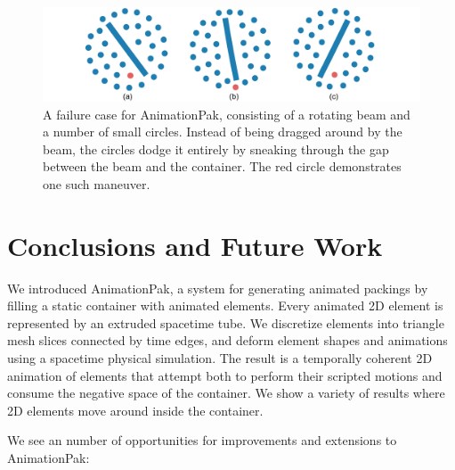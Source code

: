 \begin{figure}[t]
\centering
\includegraphics[width=1.0\textwidth]{figures/animationpak/blender.pdf} 
\caption[A failure case for AnimationPak]
{\label{fig_animationpak_blender} 
A failure case for AnimationPak, consisting of 
a rotating beam and a number of small circles.  Instead of being dragged
around by the beam, the circles dodge it entirely by sneaking through
the gap between the beam and the container.
The red circle demonstrates one such maneuver.
}
\end{figure}


\section{Conclusions and Future Work}
\label{animationpak_conclusions_and_future_work}

We introduced AnimationPak, a system for 
generating animated packings by filling a static container with animated
elements.  Every animated 2D element is represented by an extruded 
spacetime tube.
We discretize elements into triangle mesh slices connected by time edges,
and deform element shapes and animations using a spacetime physical
simulation.  The result is a temporally coherent 2D animation of elements
that attempt both to perform their scripted motions and consume the negative
space of the container.
We show a variety of results where
2D elements move around inside the container.

We see an number of opportunities for improvements and extensions to
AnimationPak:

